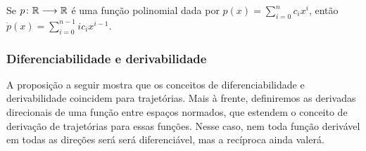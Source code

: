 \begin{exercise}
Se ${p}\colon {\mathbb{R}} \longrightarrow {\mathbb{R}}$ é uma função polinomial dada por $p(x) = \sum_{i=0}^n c_ix^i$, então $\dot{p}(x) = \sum_{i=0}^{n-1} ic_ix^{i-1}$.
\end{exercise}

\subsubsection{Diferenciabilidade e derivabilidade}

A proposição a seguir mostra que os conceitos de diferenciabilidade e derivabilidade coincidem para trajetórias. Mais à frente, definiremos as derivadas direcionais de uma função entre espaços normados, que estendem o conceito de derivação de trajetórias para essas funções. Nesse caso, nem toda função derivável em todas as direções será será diferenciável, mas a recíproca ainda valerá.

